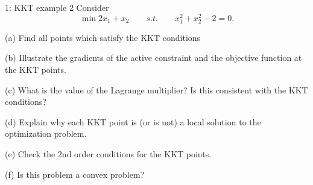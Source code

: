 
\begin{problem}{1: KKT example 2}
Consider
\[
  \min 2x_1 + x_2 \qquad s.t. \qquad x_1^2 + x_2^2 - 2 = 0
.\] 

(a) Find all points which satisfy the KKT conditions

\medskip

(b) Illustrate the gradients of the active constraint and the objective function at the KKT points.

\medskip

(c) What is the value of the Lagrange multiplier? Is this consistent with the KKT conditions?

\medskip

(d) Explain why each KKT point is (or is not) a local solution to the optimization problem.

\medskip

(e) Check the 2nd order conditions for the KKT points. 

\medskip

(f) Is this problem a convex problem?

\end{problem}


